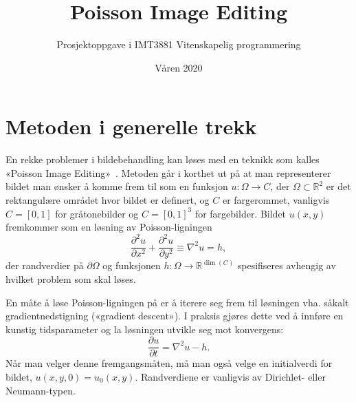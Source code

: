 \documentclass[11pt,a4paper]{article}
\begin{document}
\title{Poisson Image Editing}
\author{Prosjektoppgave i IMT3881 Vitenskapelig programmering}
\date{Våren 2020}

\maketitle

\section{Metoden i generelle trekk}

En rekke problemer i bildebehandling kan løses med en teknikk som kalles «Poisson Image Editing»~\cite{Perez:03}. Metoden går i korthet ut på at man representerer bildet man ønsker å komme frem til som en funksjon $u : \Omega \to C$, der $\Omega \subset \mathbb{R}^2$ er det rektangulære området hvor bildet er definert, og $C$ er fargerommet, vanligvis $C = [0, 1]$ for gråtonebilder og $C = [0, 1]^3$ for fargebilder. Bildet $u(x, y)$ fremkommer som en løsning av Poisson-ligningen
$$
\frac{\partial^2 u}{\partial x^2} + \frac{\partial^2 u}{\partial y^2} \equiv \nabla^2 u = h,
$$
der randverdier på $\partial\Omega$ og funksjonen $h : \Omega \to \mathbb{R}^{\dim(C)}$ spesifiseres avhengig av hvilket problem som skal løses.

En måte å løse Poisson-ligningen på er å iterere seg frem til løsningen vha. såkalt gradientnedstigning («gradient descent»). I praksis gjøres dette ved å innføre en kunstig tidsparameter og la løsningen utvikle seg mot konvergens:
\begin{equation}
\frac{\partial u}{\partial t} = \nabla^2 u - h.
\label{eq:diffusjon}
\end{equation}
Når man velger denne fremgangsmåten, må man også velge en initialverdi for bildet, $u(x, y, 0) = u_0(x, y)$. Randverdiene er vanligvis av Dirichlet- eller Neumann-typen.
\end{document}
